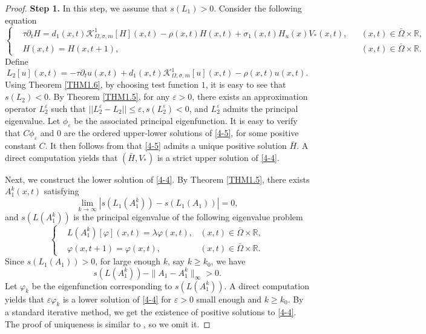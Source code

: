 \documentclass[11pt,reqno]{amsart}
\numberwithin{equation}{section}
\begin{document}
\begin{proof}
{\bf Step 1.} In this step, we assume that $s(L_{1})>0$.
Consider the following equation
\begin{equation}\label{4-5}
\left\{
\begin{aligned}
&\tau \partial_{t} H \!=\!d_{1}(x,t)\mathcal{K}^{1}_{\Omega,\sigma,m}[H](x,t)\!-\!\rho(x,t)H(x,t)+\sigma_{1}(x,t)H_{u}(x)V_{*}(x,t),&& (x,t)\in \bar\Omega\times\mathbb{R},\\
&H(x,t)=H(x,t+1),&&(x,t)\in \bar\Omega\times\mathbb{R}.
\end{aligned}
\right.
\end{equation}
%
Define
\begin{equation*}
L_{2}[u](x,t) = -\tau \partial_{t} u (x,t) + d_{1}(x,t)\mathcal{K}^{1}_{\Omega,\sigma,m}[u](x,t) -\rho(x,t)u(x,t).
\end{equation*}
%
Using Theorem \ref{THM1.6}, by choosing test function $1$, it is easy to see that $s(L_{2})<0$. By Theorem \ref{THM1.5}, for any $\varepsilon>0$, there exists an approximation operator $L_{2}^{\varepsilon}$ such that
$||L_{2}^{\varepsilon}-L_{2}  || \leq \varepsilon, s(L_{2}^{\varepsilon})<0$, and $L_{2}^{\varepsilon}$ admits the principal eigenvalue.
Let $\phi_{\varepsilon}$ be the associated principal eigenfunction.
It is easy to verify that $C\phi_{\varepsilon}$ and $0$ are the ordered upper-lower solutions of \eqref{4-5}, for some positive constant $C$.
It then follows from \cite[Theorem]{SLW} that \eqref{4-5} admits a unique positive solution $\bar{H}$.
%
A direct computation yields that $(\bar{H},V_{*})$ is a strict upper solution of \eqref{4-4}.


Next, we construct the lower solution of \eqref{4-4}.  By Theorem \ref{THM1.5}, there exists $A^{k}_{1}(x,t)$ satisfying
\begin{equation*}
\lim_{k\to\infty} \left| s(L_{1}(A^{k}_{1})) - s(L_{1}(A_{1})) \right|=0,
\end{equation*}
%
and
$s(L(A^{k}_{1}))$ is the principal eigenvalue of the following eigenvalue problem
%
\begin{equation*}
\left\{
\begin{aligned}
& L(A^{k}_{1})[\varphi](x,t) =  \lambda \varphi(x,t), & (x,t) \in \bar{\Omega} \times \mathbb{R}, \\
&\varphi(x,t+1) = \varphi(x,t), & (x,t) \in \bar{\Omega} \times \mathbb{R}.
\end{aligned}
\right.
\end{equation*}
Since $s(L_{1}(A_{1}))>0$, for large enough $k$, say $k \geq k_{0}$, we have
\begin{equation*}
s(L(A^{k}_{1})) - \| A_{1}- A^{k}_{1} \| _{\infty} > 0.
\end{equation*}
Let $\varphi_{k}$ be the eigenfunction corresponding to $s(L(A^{k}_{1}))$. A direct computation yields that $\varepsilon \varphi_{k}$ is a lower solution of \eqref{4-4} for $\varepsilon>0$ small enough and $k \geq k_{0}$.
By a standard iterative method, we get the existence of positive solutions to \eqref{4-4}. The proof of uniqueness is similar to \cite{WFLS}, so we omit it.



\end{proof}
\end{document}
